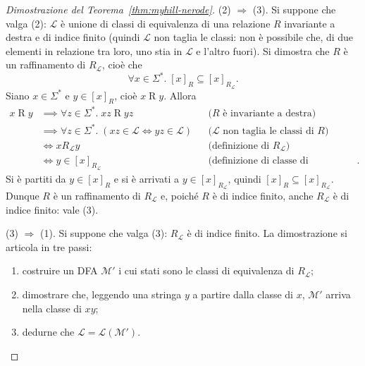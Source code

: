 \documentclass[a4paper, 11pt, oneside]{book}
\theoremstyle{formale}
\begin{document}
\begin{proof}[Dimostrazione del Teorema~\ref{thm:myhill-nerode}]
        \textsc{(2)} $\Rightarrow$ \textsc{(3)}. Si suppone che valga (2): $\mathcal{L}$
        \`e unione di classi di equivalenza di una relazione $R$ invariante a destra e di
        indice finito (quindi $\mathcal{L}$ non taglia le classi: non \`e possibile che,
        di due elementi in relazione tra loro, uno stia in $\mathcal{L}$ e l'altro fuori). Si dimostra che $R$ \`e un raffinamento di $R_{\mathcal{L}}$, cio\`e
        che
        \begin{equation*}
            \forall x \in \Sigma^*.\; [x]_R \subseteq [x]_{R_{\mathcal{L}}}.
        \end{equation*}
        Siano $x \in \Sigma^*$ e $y \in [x]_R$, cio\`e $x \mathrel{R} y$. Allora
        \begin{align*}
            x \mathrel{R} y
                &\implies \forall z \in \Sigma^*.\; xz \mathrel{R} yz
                    && \text{($R$ \`e invariante a destra)} \\
                &\implies \forall z \in \Sigma^*.\;
                    (xz \in \mathcal{L} \iff yz \in \mathcal{L})
                    && \text{($\mathcal{L}$ non taglia le classi di $R$)} \\
                &\iff x \mathrel{R_{\mathcal{L}}} y
                    && \text{(definizione di $R_{\mathcal{L}}$)} \\
                &\iff y \in [x]_{R_{\mathcal{L}}}
                    && \text{(definizione di classe di equivalenza)}.
        \end{align*}
        Si \`e partiti da $y \in [x]_R$ e si \`e arrivati a $y \in [x]_{R_{\mathcal{L}}}$,
        quindi $[x]_R \subseteq [x]_{R_{\mathcal{L}}}$. Dunque $R$ \`e un raffinamento di $R_{\mathcal{L}}$ e, poich\'e $R$ \`e di indice
        finito, anche $R_{\mathcal{L}}$ \`e di indice finito: vale (3).

        \textsc{(3)} $\Rightarrow$ \textsc{(1)}. Si suppone che valga (3):
        $R_{\mathcal{L}}$ \`e di indice finito. La dimostrazione si articola in tre passi:
        \begin{enumerate}
            \item costruire un DFA $\mathcal{M}'$ i cui stati sono le classi di
                equivalenza di $R_{\mathcal{L}}$;
            \item dimostrare che, leggendo una stringa $y$ a partire dalla classe di $x$,
                $\mathcal{M}'$ arriva nella classe di $xy$;
            \item dedurne che $\mathcal{L} = \mathcal{L}(\mathcal{M}')$.
        \end{enumerate}


\end{proof}
\end{document}
